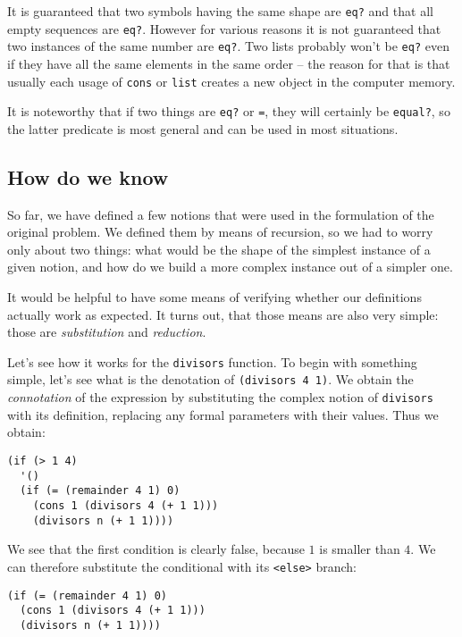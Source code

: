 It is guaranteed that two symbols having the same shape are
\texttt{eq?} and that all empty sequences are \texttt{eq?}. However
for various reasons it is not guaranteed that two instances of
the same number are \texttt{eq?}.
Two lists probably won't be \texttt{eq?} even if they have
all the same elements in the same order -- the reason for that
is that usually each usage of \texttt{cons} or \texttt{list}
creates a new object in the computer memory.

It is noteworthy that if two things are \texttt{eq?} or \texttt{=},
they will certainly be \texttt{equal?}, so the latter predicate is
most general and can be used in most situations.

\subsection{How do we know}

So far, we have defined a few notions that were used in the
formulation of the original problem. We defined them by means
of recursion, so we had to worry only about two things:
what would be the shape of the simplest instance of a given
notion, and how do we build a more complex instance out of
a simpler one.

It would be helpful to have some means of verifying whether
our definitions actually work as expected. It turns out, that
those means are also very simple: those are \textit{substitution}
and \textit{reduction}.

Let's see how it works for the \texttt{divisors} function.
To begin with something simple, let's see what is the denotation
of \texttt{(divisors 4 1)}. We obtain the \textit{connotation}
of the expression by substituting the complex notion of
\texttt{divisors} with its definition, replacing any formal
parameters with their values. Thus we obtain:

\begin{Verbatim}[samepage=true]
(if (> 1 4)
  '()
  (if (= (remainder 4 1) 0)
    (cons 1 (divisors 4 (+ 1 1)))
    (divisors n (+ 1 1))))
\end{Verbatim}

We see that the first condition is clearly false, because $1$
is smaller than $4$. We can therefore substitute the
conditional with its \texttt{<else>} branch:

\begin{Verbatim}[samepage=true]
(if (= (remainder 4 1) 0)
  (cons 1 (divisors 4 (+ 1 1)))
  (divisors n (+ 1 1))))
\end{Verbatim}

